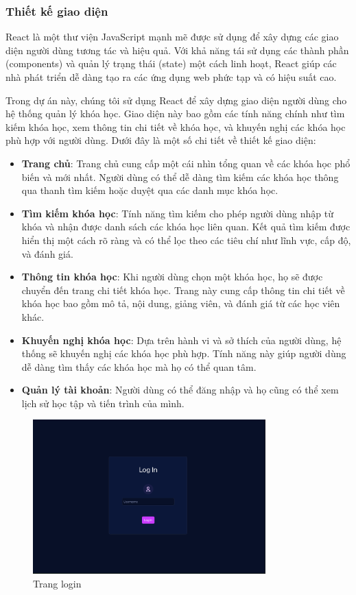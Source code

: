 \subsubsection{Thiết kế giao diện}

React là một thư viện JavaScript mạnh mẽ được sử dụng để xây dựng các giao diện người dùng tương tác và hiệu quả. Với khả năng tái sử dụng các thành phần (components) và quản lý trạng thái (state) một cách linh hoạt, React giúp các nhà phát triển dễ dàng tạo ra các ứng dụng web phức tạp và có hiệu suất cao.

Trong dự án này, chúng tôi sử dụng React để xây dựng giao diện người dùng cho hệ thống quản lý khóa học. Giao diện này bao gồm các tính năng chính như tìm kiếm khóa học, xem thông tin chi tiết về khóa học, và khuyến nghị các khóa học phù hợp với người dùng. Dưới đây là một số chi tiết về thiết kế giao diện:

\begin{itemize}
    \item \textbf{Trang chủ}: Trang chủ cung cấp một cái nhìn tổng quan về các khóa học phổ biến và mới nhất. Người dùng có thể dễ dàng tìm kiếm các khóa học thông qua thanh tìm kiếm hoặc duyệt qua các danh mục khóa học.
    \item \textbf{Tìm kiếm khóa học}: Tính năng tìm kiếm cho phép người dùng nhập từ khóa và nhận được danh sách các khóa học liên quan. Kết quả tìm kiếm được hiển thị một cách rõ ràng và có thể lọc theo các tiêu chí như lĩnh vực, cấp độ, và đánh giá.
    \item \textbf{Thông tin khóa học}: Khi người dùng chọn một khóa học, họ sẽ được chuyển đến trang chi tiết khóa học. Trang này cung cấp thông tin chi tiết về khóa học bao gồm mô tả, nội dung, giảng viên, và đánh giá từ các học viên khác.
    \item \textbf{Khuyến nghị khóa học}: Dựa trên hành vi và sở thích của người dùng, hệ thống sẽ khuyến nghị các khóa học phù hợp. Tính năng này giúp người dùng dễ dàng tìm thấy các khóa học mà họ có thể quan tâm.
    \item \textbf{Quản lý tài khoản}: Người dùng có thể đăng nhập và họ cũng có thể xem lịch sử học tập và tiến trình của mình.
\end{itemize}

\begin{figure}[H]
    \centering
    \includegraphics[width=0.8\textwidth]{figures/75.png}
    \caption{Trang login}
\end{figure}

